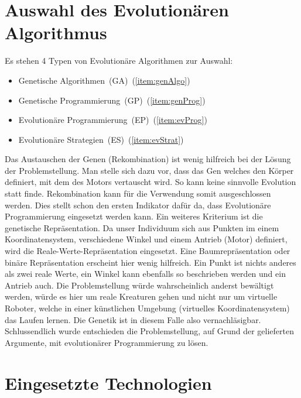 
  \section{Auswahl des Evolutionären Algorithmus}

    Es stehen 4 Typen von Evolutionäre Algorithmen zur Auswahl:
    \begin{itemize}
      \item Genetische Algorithmen~(GA)~(\vref{item:genAlgo})
      \item Genetische Programmierung~(GP)~(\vref{item:genProg})
      \item Evolutionäre Programmierung~(EP)~(\vref{item:evProg})
      \item Evolutionäre Strategien~(ES)~(\vref{item:evStrat})
    \end{itemize}
    Das Austauschen der Genen (Rekombination) ist wenig hilfreich bei der Lösung der Problemstellung.
    Man stelle sich dazu vor, dass das Gen welches den Körper definiert, mit dem des Motors vertauscht wird.
    So kann keine sinnvolle Evolution statt finde. Rekombination kann für die Verwendung somit ausgeschlossen werden.
    Dies stellt schon den ersten Indikator dafür da,
    dass Evolutionäre Programmierung eingesetzt werden kann.
    Ein weiteres Kriterium ist die genetische Repräsentation.
    Da unser Individuum sich aus Punkten im einem Koordinatensystem,
    verschiedene Winkel und einem Antrieb (Motor) definiert, wird die Reale-Werte-Repräsentation eingesetzt.
    Eine Baumrepräsentation oder binäre Repräsentation erscheint hier wenig hilfreich.
    Ein Punkt ist nichts anderes als zwei reale Werte,
    ein Winkel kann ebenfalls so beschrieben werden und ein Antrieb auch.
    Die Problemstellung würde wahrscheinlich anderst bewältigt werden,
    würde es hier um reale Kreaturen gehen und nicht nur um virtuelle Roboter,
    welche in einer künstlichen Umgebung (virtuelles Koordinatensystem) das Laufen lernen.
    Die Genetik ist in diesem Falle also vernachläsigbar.
    Schlussendlich wurde entschieden die Problemstellung, auf Grund der gelieferten Argumente, mit evolutionärer Programmierung zu lösen.

  \section{Eingesetzte Technologien\label{sec:Technology}}

